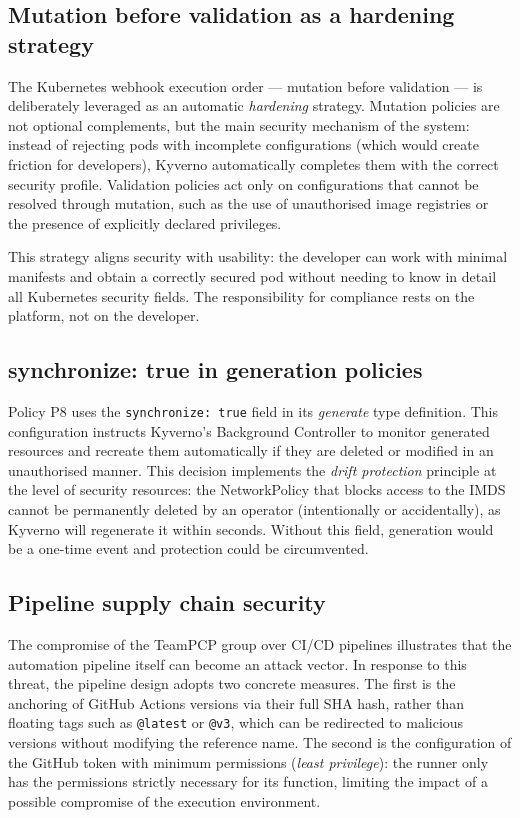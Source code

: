 \subsection{Mutation before validation as a hardening strategy}

The Kubernetes webhook execution order --- mutation before validation --- is deliberately leveraged as an automatic \textit{hardening} strategy. Mutation policies are not optional complements, but the main security mechanism of the system: instead of rejecting pods with incomplete configurations (which would create friction for developers), Kyverno automatically completes them with the correct security profile. Validation policies act only on configurations that cannot be resolved through mutation, such as the use of unauthorised image registries or the presence of explicitly declared privileges.

This strategy aligns security with usability: the developer can work with minimal manifests and obtain a correctly secured pod without needing to know in detail all Kubernetes security fields. The responsibility for compliance rests on the platform, not on the developer.

\subsection{synchronize: true in generation policies}

Policy P8 uses the \texttt{synchronize: true} field in its \textit{generate} type definition. This configuration instructs Kyverno's Background Controller to monitor generated resources and recreate them automatically if they are deleted or modified in an unauthorised manner. This decision implements the \textit{drift protection} principle at the level of security resources: the NetworkPolicy that blocks access to the IMDS cannot be permanently deleted by an operator (intentionally or accidentally), as Kyverno will regenerate it within seconds. Without this field, generation would be a one-time event and protection could be circumvented.

\subsection{Pipeline supply chain security}

The compromise of the TeamPCP group over CI/CD pipelines \cite{teampcp2026} illustrates that the automation pipeline itself can become an attack vector. In response to this threat, the pipeline design adopts two concrete measures. The first is the anchoring of GitHub Actions versions via their full SHA hash, rather than floating tags such as \texttt{@latest} or \texttt{@v3}, which can be redirected to malicious versions without modifying the reference name. The second is the configuration of the GitHub token with minimum permissions (\textit{least privilege}): the runner only has the permissions strictly necessary for its function, limiting the impact of a possible compromise of the execution environment.

